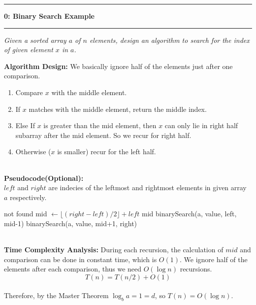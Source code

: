 \documentclass{article}
\newcommand\question[2]{\vspace{.25in}\hrule\textbf{#1: #2}\vspace{.5em}\hrule\vspace{.10in}}
\begin{document}
\newpage
\noindent
\question{0}{Binary Search Example}

\textit{Given a sorted array $a$ of $n$ elements, design an algorithm to search for the index of given element $x$ in $a$.\\}

\vspace{1em}
\noindent
\textbf{Algorithm Design:}
We basically ignore half of the elements just after one comparison.\\
\begin{enumerate}
	\item Compare $x$ with the middle element.
	\item If $x$ matches with the middle element, return the middle index.
	\item Else If $x$ is greater than the mid element, then $x$ can only lie in right half subarray after the mid element. So we recur for right half.
	\item Otherwise ($x$ is smaller) recur for the left half.
\end{enumerate}

~\\

\textbf{Pseudocode(Optional):}\\
$left$ and $right$ are indecies of the leftmost and rightmost elements in given array $a$ respectively.
\begin{algorithm}[H]
	\begin{algorithmic}[1]
		\State \Return not found
		\EndIf
		\State mid $\gets \lfloor (right-left)/2 \rfloor + left$
		\State \Return mid
		\EndIf
		\State \Return binarySearch(a, value, left, mid-1)
		\Else
		\State \Return binarySearch(a, value, mid+1, right)
		\EndIf
		\EndFunction
	\end{algorithmic}
\end{algorithm}

~\\

\textbf{Time Complexity Analysis:}
During each recursion, the calculation of $mid$ and comparison can be done in constant time, which is $O(1)$. We ignore half of the elements after each comparison, thus we need $O(\log n)$ recursions.
$$T(n) = T(n/2)+O(1)$$\\
Therefore, by the Master Theorem $\log_{b}{a}=1=d$, so $T(n) = O(\log n)$.

\newpage
\end{document}
